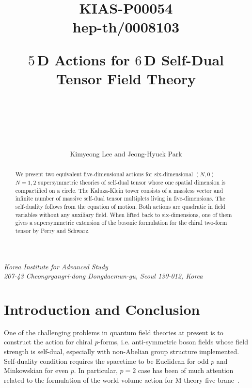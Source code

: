 \documentclass[a4paper,12pt]{article}
\begin{document}
  
\begin{titlepage}
\title{\vskip -60pt
{\small\begin{flushright} 
KIAS-P00054\\
hep-th/0008103 
\end{flushright}}
\vskip 45pt
$5$\,D Actions for $6$\,D Self-Dual Tensor Field Theory\\
~\\}
\vspace{4.0cm}
\author{\\
\\
\\Kimyeong Lee and Jeong-Hyuck Park}
\date{}
\maketitle
\vspace{-1.0cm}
\begin{center}
\textit{Korea Institute for Advanced Study}\\
\textit{207-43 Cheongryangri-dong Dongdaemun-gu, Seoul 130-012, Korea}
\end{center}
\vspace{2.0cm}
\begin{abstract}
\noindent We present two  equivalent  five-dimensional actions for six-dimensional  $(N,0)$~$N=1,2$ supersymmetric theories of self-dual tensor whose one spatial dimension is compactified on a circle.   The Kaluza-Klein tower consists of a massless vector and infinite number of massive self-dual tensor multiplets living in five-dimensions.  
The self-duality follows from the equation of motion.  
Both  actions are quadratic in field variables without any auxiliary field. When lifted back to six-dimensions, one of them  gives  a  supersymmetric extension of the bosonic formulation for the chiral two-form tensor by Perry and Schwarz. 
\end{abstract}
\thispagestyle{empty}
\end{titlepage}
\newpage


\section{Introduction and Conclusion}
One of the challenging problems in quantum field theories at present  is  to construct  the action for chiral $p$-forms, i.e. anti-symmetric boson fields whose  field strength is self-dual, especially with non-Abelian group structure implemented. Self-duality condition requires the spacetime to be Euclidean for odd $p$ and Minkowskian for even $p$.  In particular, $p=2$ case has been of much attention related to the formulation of the world-volume action for M-theory five-brane~\cite{PLB27649,NPB36760,PRL713754,9510053,9602071,9610234,9611008}.\newline
\end{document}
